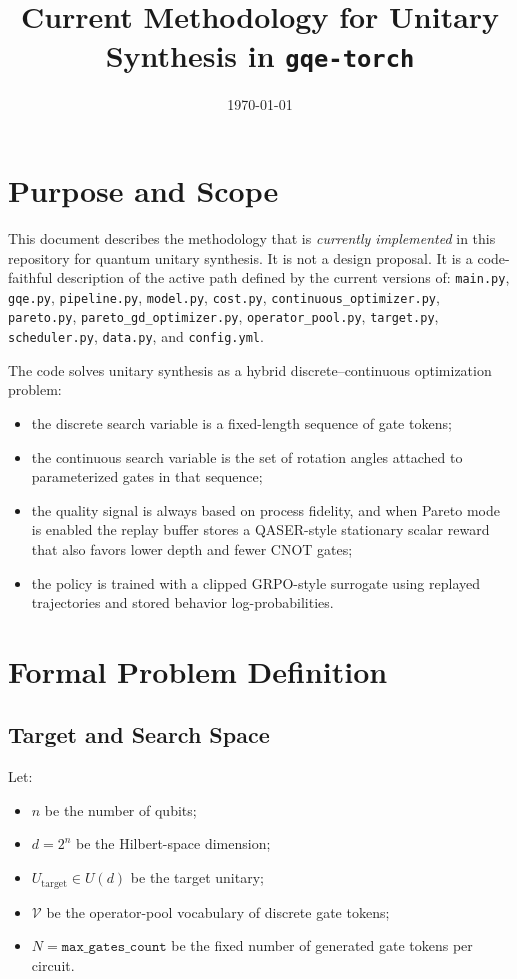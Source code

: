 \documentclass[11pt]{article}
\title{Current Methodology for Unitary Synthesis in \texttt{gqe-torch}}
\author{}
\date{\today}
\begin{document}
\maketitle
\tableofcontents

\section{Purpose and Scope}

This document describes the methodology that is \emph{currently implemented} in this repository for quantum unitary synthesis. It is not a design proposal. It is a code-faithful description of the active path defined by the current versions of:
\texttt{main.py},
\texttt{gqe.py},
\texttt{pipeline.py},
\texttt{model.py},
\texttt{cost.py},
\texttt{continuous\_optimizer.py},
\texttt{pareto.py},
\texttt{pareto\_gd\_optimizer.py},
\texttt{operator\_pool.py},
\texttt{target.py},
\texttt{scheduler.py},
\texttt{data.py},
and \texttt{config.yml}.

The code solves unitary synthesis as a hybrid discrete--continuous optimization problem:

\begin{itemize}[leftmargin=*]
\item the discrete search variable is a fixed-length sequence of gate tokens;
\item the continuous search variable is the set of rotation angles attached to parameterized gates in that sequence;
\item the quality signal is always based on process fidelity, and when Pareto mode is enabled the replay buffer stores a QASER-style stationary scalar reward that also favors lower depth and fewer CNOT gates;
\item the policy is trained with a clipped GRPO-style surrogate using replayed trajectories and stored behavior log-probabilities.
\end{itemize}

\section{Formal Problem Definition}

\subsection{Target and Search Space}

Let:
\begin{itemize}[leftmargin=*]
\item $n$ be the number of qubits;
\item $d = 2^n$ be the Hilbert-space dimension;
\item $U_{\mathrm{target}} \in U(d)$ be the target unitary;
\item $\mathcal{V}$ be the operator-pool vocabulary of discrete gate tokens;
\item $N = \texttt{max\_gates\_count}$ be the fixed number of generated gate tokens per circuit.
\end{itemize}
\end{document}
